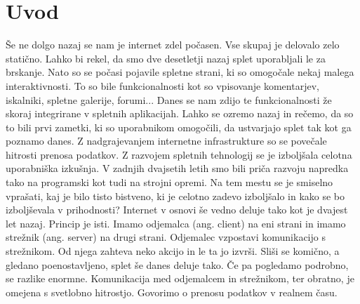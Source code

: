 \documentclass[a4paper, 12pt, twoside]{book}
\begin{document}
\chapter{Uvod}

Še ne dolgo nazaj se nam je internet zdel počasen. Vse skupaj je delovalo zelo statično. Lahko bi rekel, da smo dve desetletji nazaj splet uporabljali le za brskanje. Nato so se počasi pojavile spletne strani, ki so omogočale nekaj malega interaktivnosti. To so bile funkcionalnosti kot so vpisovanje komentarjev, iskalniki, spletne galerije, forumi... Danes se nam zdijo te funkcionalnosti že skoraj integrirane v spletnih aplikacijah. Lahko se ozremo nazaj in rečemo, da so to bili prvi zametki, ki so uporabnikom omogočili, da ustvarjajo splet tak kot ga poznamo danes. Z nadgrajevanjem internetne infrastrukture so se povečale hitrosti prenosa podatkov. Z razvojem spletnih tehnologij se je izboljšala celotna uporabniška izkušnja. V zadnjih dvajsetih letih smo bili priča razvoju napredka tako na programski kot tudi na strojni opremi. Na tem mestu se je smiselno vprašati, kaj je bilo tisto bistveno, ki je celotno zadevo izboljšalo in kako se bo izboljševala v prihodnosti? Internet v osnovi še vedno deluje tako kot je dvajest let nazaj. Princip je isti. Imamo odjemalca (ang. client) na eni strani in imamo strežnik (ang. server) na drugi strani. Odjemalec vzpostavi komunikacijo s strežnikom. Od njega zahteva neko akcijo in le ta jo izvrši. Sliši se komično, a gledano poenostavljeno, splet še danes deluje tako. Če pa pogledamo podrobno, se razlike enormne. Komunikacija med odjemalcem in strežnikom, ter obratno, je omejena s svetlobno hitrostjo. Govorimo o prenosu podatkov v realnem času.
\end{document}
